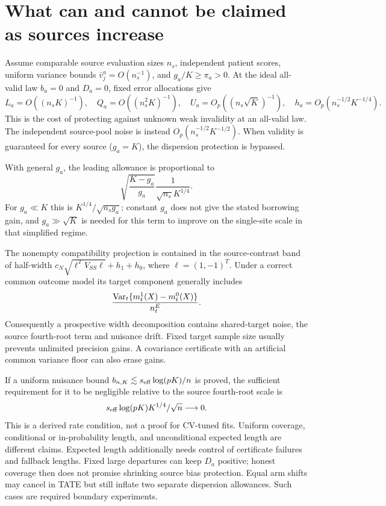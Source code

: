 \section{What can and cannot be claimed as sources increase}

Assume comparable source evaluation sizes $n_s$, independent patient scores,
uniform variance bounds $\bar v_j^a=O(n_s^{-1})$, and $g_a/K\ge\pi_a>0$.
At the ideal all-valid law $b_a=0$ and $D_a=0$, fixed error allocations give
\[
 L_a=O((n_sK)^{-1}),\quad Q_a=O((n_s^2K)^{-1}),\quad
 U_a=O_p((n_s\sqrt K)^{-1}),\quad
 h_a=O_p(n_s^{-1/2}K^{-1/4}).
\]
This is the cost of protecting against unknown weak invalidity at an
all-valid law. The independent source-pool noise is instead
$O_p(n_s^{-1/2}K^{-1/2})$. When validity is guaranteed for every source
($g_a=K$), the dispersion protection is bypassed.

With general $g_a$, the leading allowance is proportional to
\[
 \sqrt{\frac{K-g_a}{g_a}}\frac1{\sqrt{n_s}K^{1/4}}.
\]
For $g_a\ll K$ this is $K^{1/4}/\sqrt{n_sg_a}$; constant $g_a$ does not
give the stated borrowing gain, and $g_a\gg\sqrt K$ is needed for this term
to improve on the single-site scale in that simplified regime.

The nonempty compatibility projection is contained in the source-contrast
band of half-width
$c_N\sqrt{\ell^TV_{SS}\ell}+h_1+h_0$, where $\ell=(1,-1)^T$.
Under a correct common outcome model its target component generally includes
\[
 \frac{\operatorname{Var}_t\{m_t^1(X)-m_t^0(X)\}}{n_t^E}.
\]
Consequently a prospective width decomposition contains shared-target noise,
the source fourth-root term and nuisance drift. Fixed target sample size
usually prevents unlimited precision gains. A covariance certificate with
an artificial common variance floor can also erase gains.

If a uniform nuisance bound $b_{n,K}\lesssim s_{\rm eff}\log(pK)/n$ is
proved, the sufficient requirement for it to be negligible relative to the
source fourth-root scale is
\[
 s_{\rm eff}\log(pK)K^{1/4}/\sqrt n\longrightarrow0.
\]
This is a derived rate condition, not a proof for CV-tuned fits. Uniform
coverage, conditional or in-probability length, and unconditional expected
length are different claims. Expected length additionally needs control of
certificate failures and fallback lengths. Fixed large departures can keep
$D_a$ positive; honest coverage then does not promise shrinking source bias
protection. Equal arm shifts may cancel in TATE but still inflate two separate
dispersion allowances. Such cases are required boundary experiments.

